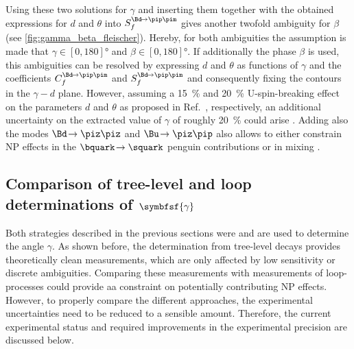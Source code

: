 Using these two solutions for $\gamma$ and inserting them together with the obtained expressions for $d$ and $\theta$ into $S_{f}^{\Bd\!\to\pip\pim}$ gives another twofold ambiguity for $\beta$ (see \cref{fig:gamma_beta_fleischer}).
Hereby, for both ambiguities the assumption is made that $\gamma\in[0, 180]\si{\degree}$ and $\beta\in[0, 180]\si{\degree}$.
If additionally the phase $\beta$ is used, this ambiguities can be resolved by expressing $d$ and $\theta$ as functions of $\gamma$ and the \CP coefficients $C_{f}^{\Bd\!\to\pip\pim}$ and $S_{f}^{\Bd\!\to\pip\pim}$ and consequently fixing the contours in the $\gamma-d$ plane.
However, assuming a \SI{15}{\percent} and \SI{20}{\percent} U-spin-breaking effect on the parameters $d$ and $\theta$ as proposed in Ref.~\cite{Fleischer:2010ib}, respectively, an additional uncertainty on the extracted value of $\gamma$ of roughly \SI{20}{\percent} could arise \cite{GammaInLoops_Fleischer2}.
Adding also the modes $\Bd\!\to\piz\piz$ and $\Bu\!\to\piz\pip$ also allows to either constrain \ac{NP} effects in the $\bquark\!\to\squark$ penguin contributions or in mixing \cite{GammaInLoops_Ciuchini}.

\subsection[head={Comparison of tree-level and loop determinations of $\gamma$},tocentry={Comparison of tree-level and loop determinations of $\gamma$}]{Comparison of tree-level and loop determinations of $\symbfsf{\gamma}$}
\label{sec:comparisonGammaDeterms}

Both strategies described in the previous sections were and are used to determine the angle $\gamma$.
As shown before, the determination from tree-level decays provides theoretically clean measurements, which are only affected by low sensitivity or discrete ambiguities.
Comparing these measurements with measurements of loop-processes could provide aa constraint on potentially contributing \ac{NP} effects.
However, to properly compare the different approaches, the experimental uncertainties need to be reduced to a sensible amount.
Therefore, the current experimental status and required improvements in the experimental precision are discussed below.

